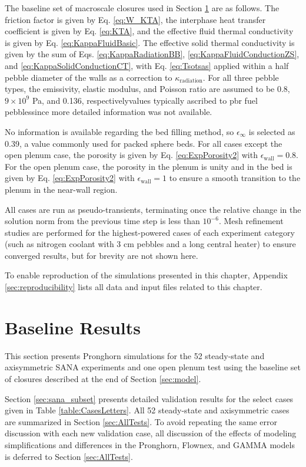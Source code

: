 The baseline set of macroscale closures used in Section \ref{sec:baseline} are as follows. The friction factor is given by Eq. \eqref{eq:W_KTA}, the interphase heat transfer coefficient is given by Eq. \eqref{eq:KTA}, and the effective fluid thermal conductivity is given by Eq. \eqref{eq:KappaFluidBasic}. The effective solid thermal conductivity is given by the sum of Eqs. \eqref{eq:KappaRadiationBB}, \eqref{eq:KappaFluidConductionZS}, and \eqref{eq:KappaSolidConductionCT}, with Eq. \eqref{eq:Tsotsas} applied within a half pebble diameter of the walls as a correction to \(\kappa_\text{radiation}\). For all three pebble types, the emissivity, elastic modulus, and Poisson ratio are assumed to be 0.8, \(9\times10^9\) Pa, and 0.136, respectively\mdash values typically ascribed to \gls{pbr} fuel pebbles\mdash since more detailed information was not available. 

No information is available regarding the bed filling method, so \(\epsilon_\infty\) is selected as 0.39, a value commonly used for packed sphere beds. For all cases except the open plenum case, the porosity is given by Eq. \eqref{eq:ExpPorosity2} with \(\epsilon_\text{wall}=0.8\). For the open plenum case, the porosity in the plenum is unity and in the bed is given by Eq. \eqref{eq:ExpPorosity2} with \(\epsilon_\text{wall}=1\) to ensure a smooth transition to the plenum in the near-wall region.

All cases are run as pseudo-transients, terminating once the relative change in the solution norm from the previous time step is less than \(10^{-6}\). Mesh refinement studies are performed for the highest-powered cases of each experiment category (such as nitrogen coolant with 3 \si{\centi\meter} pebbles and a long central heater) to ensure converged results, but for brevity are not shown here. 

To enable reproduction of the simulations presented in this chapter, Appendix \ref{sec:reproducibility} lists all data and input files related to this chapter.

\section{Baseline Results}
\label{sec:baseline}

This section presents Pronghorn simulations for the 52 steady-state and axisymmetric SANA experiments and one open plenum test using the baseline set of closures described at the end of Section \ref{sec:model}. 

Section \ref{sec:sana_subset} presents detailed validation results for the select cases given in Table \ref{table:CasesLetters}. All 52 steady-state and axisymmetric cases are summarized in Section \ref{sec:AllTests}. To avoid repeating the same error discussion with each new validation case, all discussion of the effects of modeling simplifications and differences in the Pronghorn, Flownex, and GAMMA models is deferred to Section \ref{sec:AllTests}.

